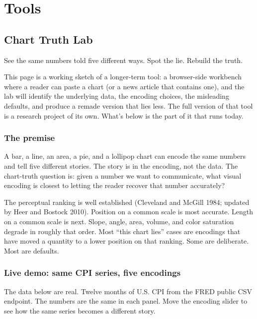 \documentclass[
  letterpaper,
  11pt,
  twoside,
  openany]{scrbook}
\begin{document}
\part{Tools}

\chapter{Chart Truth Lab}\label{chart-truth-lab}

See the same numbers told five different ways. Spot the lie. Rebuild the
truth.

\hfill\break

This page is a working sketch of a longer-term tool: a browser-side
workbench where a reader can paste a chart (or a news article that
contains one), and the lab will identify the underlying data, the
encoding choices, the misleading defaults, and produce a remade version
that lies less. The full version of that tool is a research project of
its own. What's below is the part of it that runs today.

\section{The premise}\label{the-premise}

A bar, a line, an area, a pie, and a lollipop chart can encode the same
numbers and tell five different stories. The story is in the encoding,
not the data. The chart-truth question is: given a number we want to
communicate, what visual encoding is closest to letting the reader
recover that number accurately?

The perceptual ranking is well established (Cleveland and McGill 1984;
updated by Heer and Bostock 2010). Position on a common scale is most
accurate. Length on a common scale is next. Slope, angle, area, volume,
and color saturation degrade in roughly that order. Most ``this chart
lies'' cases are encodings that have moved a quantity to a lower
position on that ranking. Some are deliberate. Most are defaults.

\section{Live demo: same CPI series, five
encodings}\label{live-demo-same-cpi-series-five-encodings}

The data below are real. Twelve months of U.S. CPI from the FRED public
CSV endpoint. The numbers are the same in each panel. Move the encoding
slider to see how the same series becomes a different story.
\end{document}
